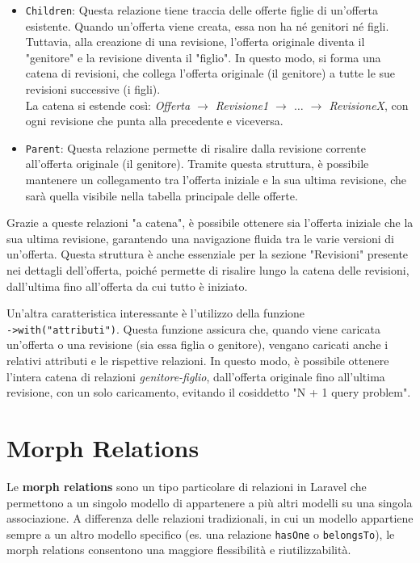 \begin{itemize}
    \item \texttt{Children}: Questa relazione tiene traccia delle offerte figlie di un'offerta esistente. Quando un'offerta viene creata, essa non ha né genitori né figli. Tuttavia, alla creazione di una revisione, l'offerta originale diventa il "genitore" e la revisione diventa il "figlio". In questo modo, si forma una catena di revisioni, che collega l'offerta originale (il genitore) a tutte le sue revisioni successive (i figli).\\
    La catena si estende così: \textit{Offerta $\rightarrow$ Revisione1 $\rightarrow$ $\dots$ $\rightarrow$ RevisioneX}, con ogni revisione che punta alla precedente e viceversa.

    \item \texttt{Parent}: Questa relazione permette di risalire dalla revisione corrente all'offerta originale (il genitore). Tramite questa struttura, è possibile mantenere un collegamento tra l'offerta iniziale e la sua ultima revisione, che sarà quella visibile nella tabella principale delle offerte.

\end{itemize}

Grazie a queste relazioni "a catena", è possibile ottenere sia l'offerta iniziale che la sua ultima revisione, garantendo una navigazione fluida tra le varie versioni di un'offerta. Questa struttura è anche essenziale per la sezione "Revisioni" presente nei dettagli dell'offerta, poiché permette di risalire lungo la catena delle revisioni, dall'ultima fino all'offerta da cui tutto è iniziato.

Un'altra caratteristica interessante è l'utilizzo della funzione\\
\texttt{->with("attributi")}. Questa funzione assicura che, quando viene caricata un'offerta o una revisione (sia essa figlia o genitore), vengano caricati anche i relativi attributi e le rispettive relazioni. In questo modo, è possibile ottenere l'intera catena di relazioni \textit{genitore-figlio}, dall'offerta originale fino all'ultima revisione, con un solo caricamento, evitando il cosiddetto "N + 1 query problem".

\section{Morph Relations}

Le \textbf{morph relations} sono un tipo particolare di relazioni in Laravel che permettono a un singolo modello di appartenere a più altri modelli su una singola associazione. A differenza delle relazioni tradizionali, in cui un modello appartiene sempre a un altro modello specifico (es. una relazione \texttt{hasOne} o \texttt{belongsTo}), le morph relations consentono una maggiore flessibilità e riutilizzabilità.

